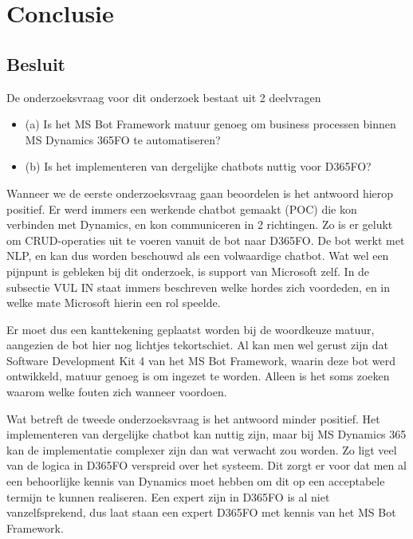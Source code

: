 
\chapter{Conclusie}
\label{ch:conclusie}

\section{Besluit}
 De onderzoeksvraag voor dit onderzoek bestaat uit 2 deelvragen
 \begin{itemize}
     \item (a) Is het MS Bot Framework matuur genoeg om business processen binnen MS Dynamics 365FO te automatiseren? 
     \item (b) Is het implementeren van dergelijke chatbots nuttig voor D365FO? 
 \end{itemize}

Wanneer we de eerste onderzoeksvraag gaan beoordelen is het antwoord hierop positief. Er werd immers een werkende chatbot gemaakt (POC) die kon verbinden met Dynamics, en kon communiceren in 2 richtingen. Zo is er gelukt om CRUD-operaties uit te voeren vanuit de bot naar D365FO. De bot werkt met NLP, en kan dus worden beschouwd als een volwaardige chatbot. Wat wel een pijnpunt is gebleken bij dit onderzoek, is support van Microsoft zelf. In de subsectie VUL IN staat immers beschreven welke hordes zich voordeden, en in welke mate Microsoft hierin een rol speelde. 

Er moet dus een kanttekening geplaatst worden bij de woordkeuze matuur, aangezien de bot hier nog lichtjes tekortschiet. Al kan men wel gerust zijn dat Software Development Kit 4 van het MS Bot Framework, waarin deze bot werd ontwikkeld, matuur genoeg is om ingezet te worden. Alleen is het soms zoeken waarom welke fouten zich wanneer voordoen. 

Wat betreft de tweede onderzoeksvraag is het antwoord minder positief. Het implementeren van dergelijke chatbot kan nuttig zijn, maar bij MS Dynamics 365 kan de implementatie complexer zijn dan wat verwacht zou worden. Zo ligt veel van de logica in D365FO verspreid over het systeem. Dit zorgt er voor dat men al een behoorlijke kennis van Dynamics moet hebben om dit op een acceptabele termijn te kunnen realiseren. Een expert zijn in D365FO is al niet vanzelfsprekend, dus laat staan een expert D365FO met kennis van het MS Bot Framework. 


